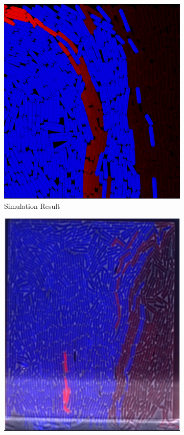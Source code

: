\documentclass[11pt,a4paper]{article}
\begin{document}
\begin{figure}[H]
    \centering
    \begin{subfigure}[b]{0.45\textwidth}
        \centering
        \includegraphics[width=\textwidth]{../figures/monInSim.png}
        \caption{Simulation Result}
        \label{fig:mono_dec_sim}
    \end{subfigure}
    \hfill
    \begin{subfigure}[b]{0.45\textwidth}
        \centering
        \includegraphics[width=\textwidth]{../figures/MonIncrReal.png}

\end{subfigure}
\end{figure}
\end{document}
